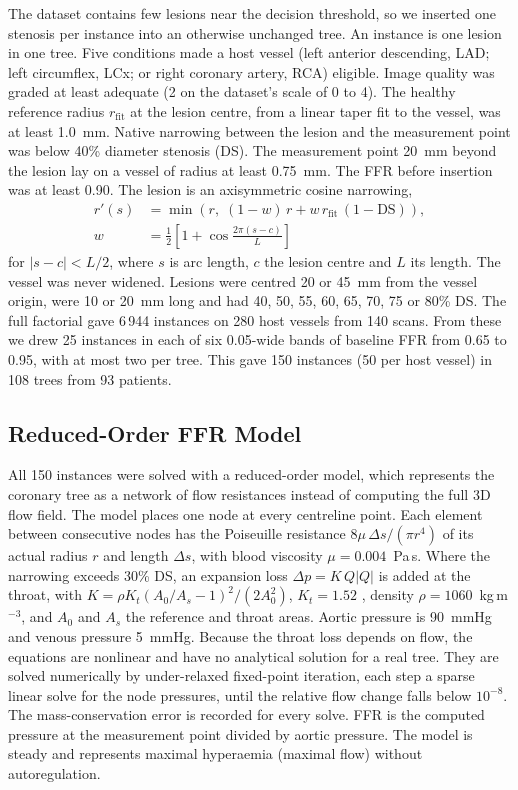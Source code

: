 \documentclass[journal]{IEEEtran}
\begin{document}
The dataset contains few lesions near the decision threshold, so we inserted one stenosis per instance into an
otherwise unchanged tree. An instance is one lesion in one tree. Five conditions made a host vessel (left anterior
descending, LAD; left circumflex, LCx; or right coronary artery, RCA) eligible. Image quality was graded at least adequate (2 on the dataset's scale of 0 to 4). The healthy reference radius $r_\mathrm{fit}$ at the lesion centre, from a linear taper
fit to the vessel, was at least 1.0~mm. Native narrowing between the lesion and the measurement point was below
40\% diameter stenosis (DS). The measurement point 20~mm beyond the lesion lay on a vessel of radius at least
0.75~mm. The FFR before insertion was at least 0.90. The lesion is an axisymmetric cosine narrowing,
\begin{equation}
\begin{aligned}
r'(s) &= \min\!\left(r,\; (1-w)\,r + w\,r_\mathrm{fit}\,(1-\mathrm{DS})\right),\\
w &= \tfrac{1}{2}\left[1+\cos\tfrac{2\pi (s-c)}{L}\right]
\end{aligned}
\end{equation}
for $|s-c|<L/2$, where $s$ is arc length, $c$ the lesion centre and $L$ its length. The vessel was never widened.
Lesions were centred 20 or 45~mm from the vessel origin, were 10 or 20~mm long and had 40, 50, 55, 60, 65, 70, 75
or 80\% DS. The full factorial gave 6\,944 instances on 280 host vessels from 140 scans. From these we drew 25
instances in each of six 0.05-wide bands of baseline FFR from 0.65 to 0.95, with at most two per tree. This gave
150 instances (50 per host vessel) in 108 trees from 93 patients.

\subsection{Reduced-Order FFR Model}
All 150 instances were solved with a reduced-order model, which represents the coronary tree as a network of flow
resistances instead of computing the full 3D flow field. The model places one node at every centreline point. Each element between consecutive nodes has the Poiseuille
resistance $8\mu\,\Delta s/(\pi r^4)$ of its actual radius $r$ and length $\Delta s$, with blood viscosity
$\mu = 0.004$~Pa\,s. Where the narrowing exceeds 30\% DS, an expansion loss $\Delta p = K\,Q|Q|$ is added at the
throat, with $K = \rho K_t (A_0/A_s - 1)^2 / (2A_0^2)$, $K_t = 1.52$ \cite{young1973}, density
$\rho = 1060$~kg\,m$^{-3}$, and $A_0$ and $A_s$ the reference and throat areas. Aortic pressure is 90~mmHg and
venous pressure 5~mmHg. Because the throat loss depends on flow, the equations are nonlinear and have no analytical solution
for a real tree. They are solved numerically by under-relaxed fixed-point iteration, each step a sparse linear
solve for the node pressures, until the relative flow change falls below $10^{-8}$. The mass-conservation error is recorded for every solve. FFR is the computed
pressure at the measurement point divided by aortic pressure. The model is steady and represents maximal hyperaemia
(maximal flow) without autoregulation.
\end{document}
